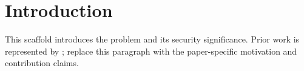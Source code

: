 \section{Introduction}
This scaffold introduces the problem and its security significance. Prior work is represented by \cite{sample2024}; replace this paragraph with the paper-specific motivation and contribution claims.
